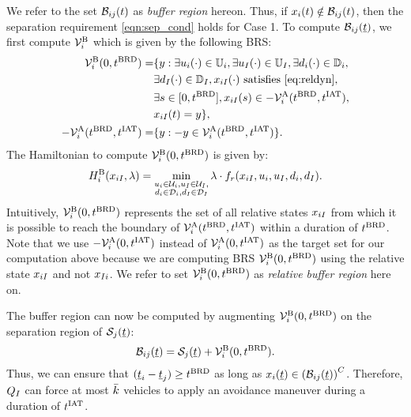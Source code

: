 We refer to the set $\mathcal{B}_{ij}(t)$ as \textit{buffer region} hereon. Thus, if $x_i(t) \notin \mathcal{B}_{ij}(t)$, then the separation requirement \eqref{eqn:sep_cond} holds for Case 1. To compute $\mathcal{B}_{ij}(\underline{t})$, we first compute $\mathcal{V}^{\text{B}}_{i}$ which is given by the following BRS:
\begin{equation} \label{eqn:buffBRS_case1}
\begin{aligned}
\brs^{\text{B}}_{i}(0, \brd) = & \{y: \exists \ctrl_i(\cdot) \in \cfset_i, \exists \ctrl_\intr(\cdot) \in \cfset_\intr, \exists \dstb_i(\cdot) \in \dfset_i, \\
& \exists \dstb_\intr(\cdot) \in \dfset_\intr, \state_{i \intr}(\cdot) \text{ satisfies \eqref{eq:reldyn}},\\
& \exists s \in [0, \brd], \state_{i \intr}(s) \in -\brs^{\text{A}}_{i}(\brd, \iat),\\
& \state_{i \intr}(t) = y\},\\
-\brs^{\text{A}}_{i}(\brd, \iat) = & \{y: -y \in \brs^{\text{A}}_{i}(\brd, \iat) \}.
\end{aligned}
\end{equation}
The Hamiltonian to compute $\mathcal{V}^{\text{B}}_{i}(0, t^\text{BRD})$ is given by:
\begin{equation} 
H^{\text{B}}_{i}(x_{i I}, \lambda) = \min_{\substack{u_i \in \mathcal{U}_i, u_I \in \mathcal{U}_I, \\ d_i \in \mathcal{D}_i, d_I \in \mathcal{D}_I}} \lambda \cdot f_r(x_{i I}, u_i, u_I, d_i, d_I).
\end{equation}
Intuitively, $\mathcal{V}^{\text{B}}_{i}(0, t^\text{BRD})$ represents the set of all relative states $x_{i I}$ from which it is possible to reach the boundary of $\mathcal{V}^{\text{A}}_{i}(t^\text{BRD}, t^\text{IAT})$ within a duration of $t^\text{BRD}$. Note that we use $-\mathcal{V}^{\text{A}}_{i}(0, t^\text{IAT})$ instead of $\mathcal{V}^{\text{A}}_{i}(0, t^\text{IAT})$ as the target set for our computation above because we are computing BRS $\mathcal{V}^{\text{B}}_{i}(0, t^\text{BRD})$ using the relative state $x_{i I}$ and not $x_{I i}$. We refer to set $\mathcal{V}^{\text{B}}_{i}(0, t^\text{BRD})$ as \textit{relative buffer region} here on. %

The buffer region can now be computed by augmenting $\mathcal{V}^{\text{B}}_{i}(0, t^\text{BRD})$ on the separation region of $\mathcal{S}_j(\underline{t})$:
\begin{equation} \label{eqn:buffRegion_case1}
\buff_{ij}(\tsa) = \sep_j(\tsa) + \brs^{\text{B}}_{i}(0, \brd).
\end{equation} 
Thus, we can ensure that $(\underline{t}_i - \underline{t}_j) \geq t^\text{BRD}$ as long as $x_i(\underline{t}) \in \left(\mathcal{B}_{ij}(\underline{t})\right)^C$. Therefore, $Q_{I}$ can force at most $\bar{k}$ vehicles to apply an avoidance maneuver during a duration of $t^\text{IAT}$.